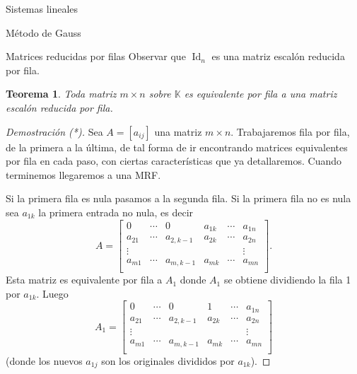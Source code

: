 \documentclass[a4paper,12pt,twoside,spanish,reqno]{amsbook}
\newtheorem{teorema}{Teorema}[section]
\theoremstyle{definition}
\theoremstyle{remark}
\newcommand{\Id}{\operatorname{Id}}
\newcommand{\K}{\mathbb K}
\begin{document}
\begin{chapter}{Sistemas lineales}
\begin{section}{Método de Gauss }
\begin{subsection}{Matrices reducidas por filas}
                Observar que $\Id_n$ es una matriz escalón reducida por fila.
                
                \begin{teorema}\label{th-merf}
                    Toda matriz $m \times n$ sobre $\K$ es equivalente por fila a una matriz escalón reducida por fila.
                \end{teorema}
                \begin{proof}[Demostración (*)]
                    Sea $A = [a_{ij}]$ una matriz $m \times n$. Trabajaremos fila por fila, de la primera a la última, de tal forma de ir encontrando matrices equivalentes por fila en cada paso, con ciertas características que ya detallaremos. Cuando terminemos llegaremos a una MRF.  
                    
                    Si la primera fila es nula pasamos a la segunda fila. Si la primera fila no es nula sea $a_{1k}$ la primera entrada no nula, es decir
                    \begin{equation*}
                    A = \begin{bmatrix}
                    0 & \cdots & 0 & a_{1k} & \cdots & a_{1n} \\
                    a_{21}& \cdots & a_{2,k-1} & a_{2k} & \cdots & a_{2n} \\
                    \vdots&  &  &  &  & \vdots \\
                    a_{m1}& \cdots & a_{m,k-1} & a_{mk} & \cdots & a_{mn} \\
                    \end{bmatrix}.
                    \end{equation*} 
                    Esta matriz es equivalente por fila a $A_1$ donde $A_1$ se obtiene dividiendo la fila 1 por $a_{1k}$. Luego 
                    \begin{equation*}
                    A_1 = \begin{bmatrix}
                    0 & \cdots & 0 & 1 & \cdots & a_{1n} \\
                    a_{21}& \cdots & a_{2,k-1} & a_{2k} & \cdots & a_{2n} \\
                    \vdots&  &  &  &  & \vdots \\
                    a_{m1}& \cdots & a_{m,k-1} & a_{mk} & \cdots & a_{mn} \\
                    \end{bmatrix}
                    \end{equation*}
                    (donde los nuevos $a_{1j}$ son  los originales divididos por $a_{1k}$).  
                    

\end{proof}
\end{subsection}
\end{section}
\end{chapter}
\end{document}
